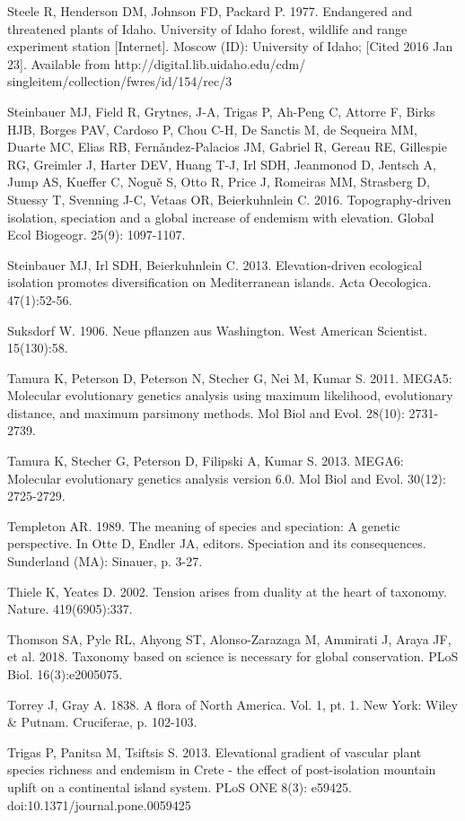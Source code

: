 Steele R, Henderson DM, Johnson FD, Packard P. 1977. Endangered and threatened plants of Idaho. University of Idaho forest, wildlife and range experiment station [Internet]. Moscow (ID): University of Idaho; [Cited 2016 Jan 23]. Available from http://digital.lib.uidaho.edu/cdm/ singleitem/collection/fwres/id/154/rec/3

Steinbauer MJ, Field R, Grytnes, J-A, Trigas P, Ah-Peng C, Attorre F, Birks HJB, Borges PAV, Cardoso P, Chou C-H, De Sanctis M, de Sequeira MM,  Duarte MC, Elias RB, Fern\v{a}ndez-Palacios JM, Gabriel R, Gereau RE, Gillespie RG, Greimler J, Harter DEV, Huang T-J, Irl SDH, Jeanmonod D, Jentsch A, Jump AS, Kueffer C, Nogu\v{e} S, Otto R, Price J, Romeiras MM, Strasberg D, Stuessy T, Svenning J-C, Vetaas OR, Beierkuhnlein C. 2016. Topography-driven isolation, speciation and a global increase of endemism with elevation. Global Ecol Biogeogr. 25(9): 1097-1107.

Steinbauer MJ, Irl SDH, Beierkuhnlein C. 2013. Elevation-driven ecological isolation promotes diversification on Mediterranean islands. Acta Oecologica. 47(1):52-56.

Suksdorf W. 1906. Neue pflanzen aus Washington. West American Scientist. 15(130):58.

Tamura K, Peterson D, Peterson N, Stecher G, Nei M, Kumar S. 2011. MEGA5: Molecular evolutionary genetics analysis using maximum likelihood, evolutionary distance, and maximum parsimony methods. Mol Biol and Evol. 28(10): 2731-2739.

Tamura K, Stecher G, Peterson D, Filipski A, Kumar S. 2013. MEGA6: Molecular evolutionary genetics analysis version 6.0. Mol Biol and Evol. 30(12): 2725-2729.

Templeton AR. 1989. The meaning of species and speciation: A genetic perspective. In Otte D, Endler JA, editors. Speciation and its consequences. Sunderland (MA): Sinauer, p. 3-27.

Thiele K, Yeates D. 2002. Tension arises from duality at the heart of taxonomy. Nature. 419(6905):337.

Thomson SA, Pyle RL, Ahyong ST, Alonso-Zarazaga M, Ammirati J, Araya JF, et al. 2018. Taxonomy based on science is necessary for global conservation. PLoS Biol. 16(3):e2005075.

Torrey J, Gray A. 1838. A flora of North America. Vol. 1, pt. 1. New York: Wiley \& Putnam. Cruciferae, p. 102-103.

Trigas P, Panitsa M, Tsiftsis S. 2013. Elevational gradient of vascular plant species richness and endemism in Crete - the effect of post-isolation mountain uplift on a continental island system. PLoS ONE 8(3): e59425. doi:10.1371/journal.pone.0059425

